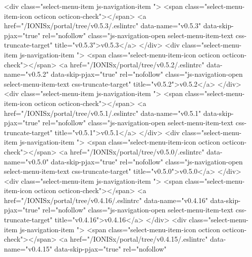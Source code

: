             <div class="select-menu-item js-navigation-item ">
              <span class="select-menu-item-icon octicon octicon-check"></span>
              <a href="/IONISx/portal/tree/v0.5.3/.eslintrc"
                 data-name="v0.5.3"
                 data-skip-pjax="true"
                 rel="nofollow"
                 class="js-navigation-open select-menu-item-text css-truncate-target"
                 title="v0.5.3">v0.5.3</a>
            </div>
            <div class="select-menu-item js-navigation-item ">
              <span class="select-menu-item-icon octicon octicon-check"></span>
              <a href="/IONISx/portal/tree/v0.5.2/.eslintrc"
                 data-name="v0.5.2"
                 data-skip-pjax="true"
                 rel="nofollow"
                 class="js-navigation-open select-menu-item-text css-truncate-target"
                 title="v0.5.2">v0.5.2</a>
            </div>
            <div class="select-menu-item js-navigation-item ">
              <span class="select-menu-item-icon octicon octicon-check"></span>
              <a href="/IONISx/portal/tree/v0.5.1/.eslintrc"
                 data-name="v0.5.1"
                 data-skip-pjax="true"
                 rel="nofollow"
                 class="js-navigation-open select-menu-item-text css-truncate-target"
                 title="v0.5.1">v0.5.1</a>
            </div>
            <div class="select-menu-item js-navigation-item ">
              <span class="select-menu-item-icon octicon octicon-check"></span>
              <a href="/IONISx/portal/tree/v0.5.0/.eslintrc"
                 data-name="v0.5.0"
                 data-skip-pjax="true"
                 rel="nofollow"
                 class="js-navigation-open select-menu-item-text css-truncate-target"
                 title="v0.5.0">v0.5.0</a>
            </div>
            <div class="select-menu-item js-navigation-item ">
              <span class="select-menu-item-icon octicon octicon-check"></span>
              <a href="/IONISx/portal/tree/v0.4.16/.eslintrc"
                 data-name="v0.4.16"
                 data-skip-pjax="true"
                 rel="nofollow"
                 class="js-navigation-open select-menu-item-text css-truncate-target"
                 title="v0.4.16">v0.4.16</a>
            </div>
            <div class="select-menu-item js-navigation-item ">
              <span class="select-menu-item-icon octicon octicon-check"></span>
              <a href="/IONISx/portal/tree/v0.4.15/.eslintrc"
                 data-name="v0.4.15"
                 data-skip-pjax="true"
                 rel="nofollow"
